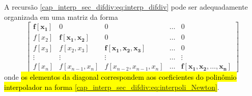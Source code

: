 \begin{obs}
  A recursão \eqref{cap_interp_sec_difdiv:eq:interp_difdiv} pode ser adequadamente organizada em uma matriz da forma
  \begin{equation}
    \begin{bmatrix}
      \pmb{f[x_1]} & 0 & 0 & \ldots & 0 \\
      f[x_2] & \pmb{f[x_1,x_2]} & 0 & \ldots & 0 \\
      f[x_3] & f[x_2,x_3] & \pmb{f[x_1,x_2,x_3]} & \ldots & 0\\
      \vdots & \vdots & \vdots & \ldots & \vdots \\
      f[x_n] & f[x_{n-1},x_{n}] & f[x_{n-2},x_{n-1},x_n] & \ldots & \pmb{f[x_1,x_2,\dotsc,x_n]}
    \end{bmatrix}
  \end{equation}
onde \hl{os elementos da diagonal correspondem aos coeficientes do polinômio interpolador na forma {\eqref{cap_interp_sec_difdiv:eq:interpoli_Newton}}}.
\end{obs}


